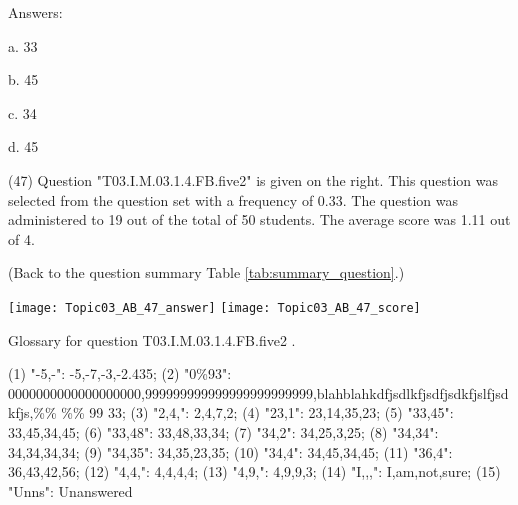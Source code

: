 \documentclass[12pt,english,nohyper]{tufte-handout}\usepackage[]{graphicx}\usepackage[]{color}
\begin{document}
{Answers:



a. 33



b. 45



c. 34



d. 45 

} (47) Question "T03.I.M.03.1.4.FB.five2" is given on the right. This question was selected from the question set with a frequency of 0.33. The question was administered to 19 out of the total of 50 students. The average score was 1.11 out of 4.

 (Back to the question summary Table \ref{tab:summary_question}.)

\begin{center} \texttt{[image: Topic03\_AB\_47\_answer]} \texttt{[image: Topic03\_AB\_47\_score]} \end{center} 

Glossary for question T03.I.M.03.1.4.FB.five2 .

(1) "-5,-": -5,-7,-3,-2.435; (2) "0\%93": 0000000000000000000,999999999999999999999999,blahblahkdfjsdlkfjsdfjsdkfjslfjsdkfjs,\%\%     \%\% 99  33; (3) "2,4,": 2,4,7,2; (4) "23,1": 23,14,35,23; (5) "33,45": 33,45,34,45; (6) "33,48": 33,48,33,34; (7) "34,2": 34,25,3,25; (8) "34,34": 34,34,34,34; (9) "34,35": 34,35,23,35; (10) "34,4": 34,45,34,45; (11) "36,4": 36,43,42,56; (12) "4,4,": 4,4,4,4; (13) "4,9,": 4,9,9,3; (14) "I,,,": I,am,not,sure; (15) "Unns": Unanswered
\end{document}
